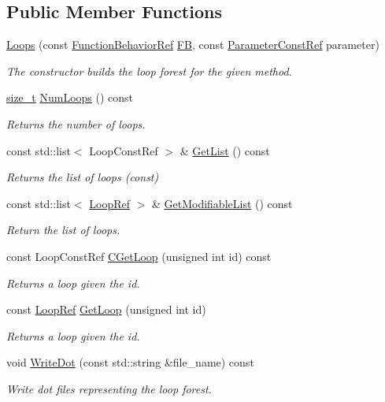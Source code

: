 \subsection*{Public Member Functions}
\begin{DoxyCompactItemize}
\item 
\hyperlink{classLoops_a4468afbab8156bb55299b15e35bb81ba}{Loops} (const \hyperlink{function__behavior_8hpp_affbc6a46ab86ddfabe31c10986d333dc}{Function\+Behavior\+Ref} \hyperlink{classLoops_ab337d3197422c62eabab4566280e95df}{FB}, const \hyperlink{Parameter_8hpp_a37841774a6fcb479b597fdf8955eb4ea}{Parameter\+Const\+Ref} parameter)
\begin{DoxyCompactList}\small\item\em The constructor builds the loop forest for the given method. \end{DoxyCompactList}\item 
\hyperlink{tutorial__fpt__2017_2intro_2sixth_2test_8c_a7c94ea6f8948649f8d181ae55911eeaf}{size\+\_\+t} \hyperlink{classLoops_a9cb155a94cf7363e6f15e770441fe20c}{Num\+Loops} () const
\begin{DoxyCompactList}\small\item\em Returns the number of loops. \end{DoxyCompactList}\item 
const std\+::list$<$ Loop\+Const\+Ref $>$ \& \hyperlink{classLoops_aa8f1cb77af609624c7c6cd0da9fc00a4}{Get\+List} () const
\begin{DoxyCompactList}\small\item\em Returns the list of loops (const) \end{DoxyCompactList}\item 
const std\+::list$<$ \hyperlink{loop_8hpp_aa4a60313089619376f67557c4120423c}{Loop\+Ref} $>$ \& \hyperlink{classLoops_a6376c9fcfe6f046d1d8aa30570076eb2}{Get\+Modifiable\+List} () const
\begin{DoxyCompactList}\small\item\em Return the list of loops. \end{DoxyCompactList}\item 
const Loop\+Const\+Ref \hyperlink{classLoops_a55b90509f95276dd9cc5ca5cbfeb01b1}{C\+Get\+Loop} (unsigned int id) const
\begin{DoxyCompactList}\small\item\em Returns a loop given the id. \end{DoxyCompactList}\item 
const \hyperlink{loop_8hpp_aa4a60313089619376f67557c4120423c}{Loop\+Ref} \hyperlink{classLoops_ae1017c5d90fca5a7717adf98d5b73712}{Get\+Loop} (unsigned int id)
\begin{DoxyCompactList}\small\item\em Returns a loop given the id. \end{DoxyCompactList}\item 
void \hyperlink{classLoops_a52664116b60c75c5a56eaf38317e0d94}{Write\+Dot} (const std\+::string \&file\+\_\+name) const
\begin{DoxyCompactList}\small\item\em Write dot files representing the loop forest. \end{DoxyCompactList}\end{DoxyCompactItemize}
